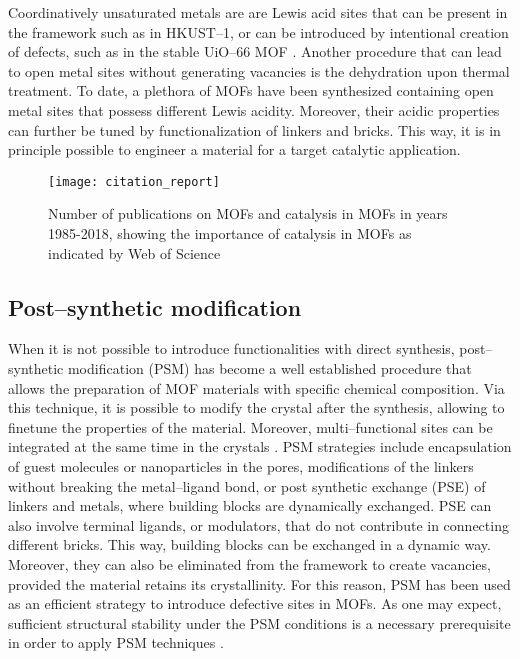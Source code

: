 \npar
Coordinatively unsaturated metals are are Lewis acid sites that can be present in the framework such as in HKUST--1\cite{chui1999chemically}, or can be introduced by intentional creation of defects, such as in the stable UiO--66 MOF \cite{vandichel2015active}. Another procedure that can lead to open metal sites without generating vacancies is the dehydration upon thermal treatment. To date, a plethora of MOFs have been synthesized containing open metal sites that possess different Lewis acidity. Moreover, their acidic properties can further be tuned by functionalization of linkers and bricks. This way, it is in principle possible to engineer a material for a target catalytic application.

\begin{figure}[!htbp]
	\centering
 	\texttt{[image: citation\_report]}
	\caption{Number of publications on MOFs and catalysis in MOFs in years 1985-2018, showing the importance of catalysis in MOFs as indicated by Web of Science}
	\label{fig:citation_report}
\end{figure}
%
\subsection*{Post--synthetic modification}
When it is not possible to introduce functionalities with direct synthesis, post--synthetic modification (PSM) \cite{wang2009postsynthetic, cohen2011postsynthetic} has become a well established procedure that allows the preparation of MOF materials with specific chemical composition. Via this technique, it is possible to modify the crystal after the synthesis, allowing to finetune the properties of the material. Moreover, multi--functional sites can be integrated at the same time in the crystals \cite{li2016applications}. PSM strategies include encapsulation of guest molecules or nanoparticles in the pores, modifications of the linkers without breaking the metal--ligand bond, or post synthetic exchange (PSE) of linkers and metals, where building blocks are dynamically exchanged. PSE can also involve terminal ligands, or modulators, that do not contribute in connecting different bricks. This way, building blocks can be exchanged in a dynamic way. Moreover, they can also be eliminated from the framework to create vacancies, provided the material retains its crystallinity. For this reason, PSM has been used as an efficient strategy to introduce defective sites in MOFs. As one may expect, sufficient structural stability under the PSM conditions is a necessary prerequisite in order to apply PSM techniques \cite{garibay2010isoreticular}.
%
